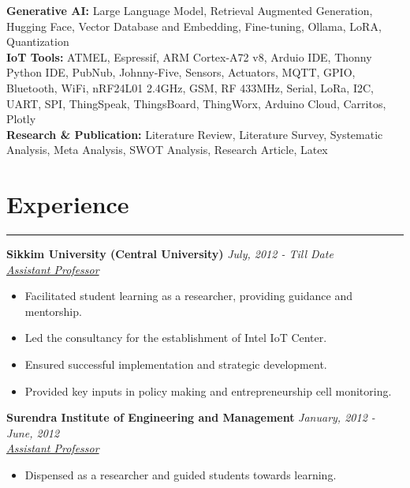 \documentclass[10pt]{article}
\begin{document}
	

			\textbf{Generative AI:} Large Language Model, Retrieval Augmented Generation, Hugging Face, Vector Database and Embedding, Fine-tuning, Ollama, LoRA, Quantization
		\\ 
			\textbf{IoT Tools:} ATMEL, Espressif, ARM Cortex-A72 v8, Arduio IDE, Thonny Python IDE,  PubNub, Johnny-Five, Sensors, Actuators, MQTT, GPIO, Bluetooth, WiFi, nRF24L01 2.4GHz, GSM, RF 433MHz, Serial, LoRa, I2C, UART, SPI, ThingSpeak, ThingsBoard, ThingWorx, Arduino Cloud, Carritos, Plotly
		\\
		\textbf{Research \& Publication:} Literature Review, Literature Survey, Systematic Analysis, Meta Analysis, SWOT Analysis, Research Article, Latex 

    
		\vspace*{-3mm}
		
	

\section*{Experience}
\vspace*{-2.5mm}
\hrule 
\vspace*{2mm}
  \noindent\textbf{Sikkim University (Central University)} \hfill \textit{July, 2012 - Till Date}\\
  \textit{\underline{Assistant Professor}} \\
  \vspace*{-4mm}
    \begin{itemize}[leftmargin=*]
	\item Facilitated student learning as a researcher, providing guidance and mentorship.
	    \vspace*{-2.5mm}
	\item Led the consultancy for the establishment of Intel IoT Center. 
	\vspace*{-2.5mm}
	\item Ensured successful implementation and strategic development.
	    \vspace*{-2.5mm}
	\item Provided key inputs in policy making and entrepreneurship cell monitoring.  
	\end{itemize}

  \noindent\textbf{Surendra Institute of Engineering and Management} \hfill \textit{January, 2012 - June, 2012}\\
  \textit{\underline{Assistant Professor}} \\
\vspace*{-4mm}
\begin{itemize}[leftmargin=*]
	\item Dispensed as a researcher and guided students towards learning.

\end{itemize}
\end{document}

